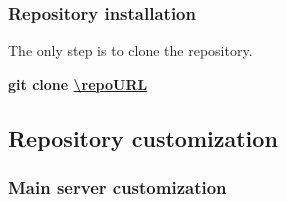 \subsubsection{Repository installation}\label{subsubsec:repo-installation}
\begin{flushleft}
    The only step is to clone the repository.
    \begin{flushleft}
        \textbf{git clone \url{\repoURL}}
    \end{flushleft}
\end{flushleft}




\subsection{Repository customization}\label{subsec:repo-customization}
\subsubsection[Main server customization]{Main server customization}
